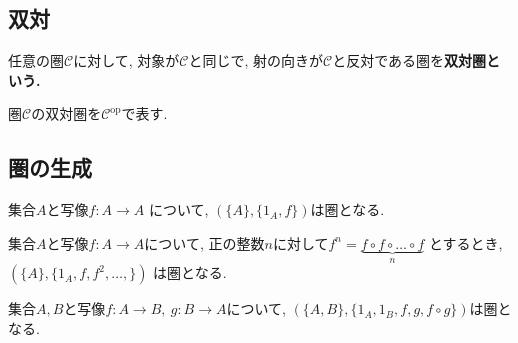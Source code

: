 \subsection{双対}
\begin{Def}
任意の圏$\mathscr{C}$に対して, 対象が$\mathscr{C}$と同じで, 射の向きが$\mathscr{C}$と反対である圏を\bf{双対圏}という.
\end{Def}
\begin{Notation}
圏$\mathscr{C}$の双対圏を$\mathscr{C}^{\mathrm{op}}$で表す.
\end{Notation}
\begin{comment}
\begin{caution}
双対の原理
\end{caution}
\end{comment}
\subsection{圏の生成}
\begin{Prop}
集合$A$と写像$f:A\rightarrow A$
について, $(\{A\},\{1_A,f\})$は圏となる.
\end{Prop}
\begin{comment}
\begin{proof}
$\mathrm{dom} f=\mathrm{cod}f$であるから, 合成射$f\circ f$を定めることができる.
このとき$f\circ f=1_A$もしくは$f\circ f=f$である.

$f\circ f=1_A$ならば...

...

となる.
一方, $f\circ f=1_A$ならば...

...

となる.
以上より, いずれの場合も, 射の合成が結合律を満たすことがわかる.
したがって$f\circ f=1_A$と定めても$f\circ f=f$と定めても圏を生成することができる.
\end{proof}
\end{comment}
\begin{Prop}
集合$A$と写像$f:A\rightarrow A$について, 正の整数$n$に対して$f^n=\underbrace{f\circ f \circ \dots \circ f}_{n}$
とするとき,
$(\{A\},\{1_A,f,f^2,\dots,\})$
は圏となる.
\end{Prop}
\begin{comment}
\begin{proof}
\end{proof}
\end{comment}
\begin{Prop}
集合$A,B$と写像$f:A\rightarrow B,\ g:B\rightarrow A$について,
$(\{A,B\}, \{1_A,1_B,f,g,f\circ g\})$は圏となる.
\end{Prop}
